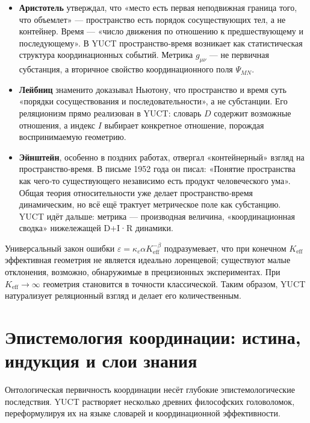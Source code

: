 \documentclass[12pt,a4paper]{article}
\begin{document}
	\begin{itemize}
		\item \textbf{Аристотель} утверждал, что «место есть первая неподвижная граница того, что объемлет» — пространство есть порядок сосуществующих тел, а не контейнер. Время — «число движения по отношению к предшествующему и последующему». В YUCT пространство‑время возникает как статистическая структура координационных событий. Метрика \(g_{\mu\nu}\) — не первичная субстанция, а вторичное свойство координационного поля \(\Psi_{MN}\).
		
		\item \textbf{Лейбниц} знаменито доказывал Ньютону, что пространство и время суть «порядки сосуществования и последовательности», а не субстанции. Его реляционизм прямо реализован в YUCT: словарь \(D\) содержит возможные отношения, а индекс \(I\) выбирает конкретное отношение, порождая воспринимаемую геометрию.
		
		\item \textbf{Эйнштейн}, особенно в поздних работах, отвергал «контейнерный» взгляд на пространство‑время. В письме 1952 года он писал: «Понятие пространства как чего‑то существующего независимо есть продукт человеческого ума». Общая теория относительности уже делает пространство‑время динамическим, но всё ещё трактует метрическое поле как субстанцию. YUCT идёт дальше: метрика — производная величина, «координационная сводка» нижележащей D+I·R динамики.
	\end{itemize}
	
	Универсальный закон ошибки \(\varepsilon = \kappa_c \alpha K_{\mathrm{eff}}^{-\beta}\) подразумевает, что при конечном \(K_{\mathrm{eff}}\) эффективная геометрия не является идеально лоренцевой; существуют малые отклонения, возможно, обнаружимые в прецизионных экспериментах. При \(K_{\mathrm{eff}} \to \infty\) геометрия становится в точности классической. Таким образом, YUCT натурализует реляционный взгляд и делает его количественным.
	
	\section{Эпистемология координации: истина, индукция и слои знания}
	\label{sec:epistemology}
	
	Онтологическая первичность координации несёт глубокие эпистемологические последствия. YUCT растворяет несколько древних философских головоломок, переформулируя их на языке словарей и координационной эффективности.
	
\end{document}
